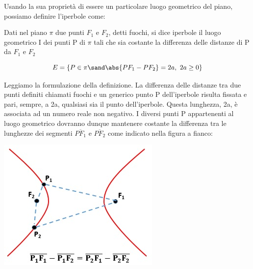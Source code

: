 Usando la sua proprietà di essere un particolare luogo geometrico del 
piano, possiamo definire l'iperbole come:
\begin{definizione}
  Dati nel piano $ \pi $ due punti $ F_{1} $ e $ F_{2} $, detti 
fuochi, si dice iperbole il luogo geometrico I dei punti P di $ \pi $ tali 
che sia costante la differenza delle distanze di P da $F_{1}$ e $F_{2}$ 

\begin{equation}
  E=\{P \in\pi \sand \abs{PF_{1}-PF_{2}} = 2a,~2a \geq 0\}
\end{equation}
\end{definizione}

  \begin{minipage}[c]{.75\textwidth}
Leggiamo la formulazione della definizione. La differenza delle distanze 
tra due punti definiti chiamati fuochi e un generico punto P dell'iperbole 
risulta fissata e pari, sempre, a 2a, qualsiasi sia il punto dell'iperbole. 
Questa lunghezza, 2a, è associata ad un numero reale non negativo.
I diversi punti P appartenenti al luogo geometrico dovranno dunque 
mantenere costante la differenza tra le lunghezze dei segmenti 
$\overline{PF_{1}}$ e $\overline{PF_{2}}$ come indicato nella figura a 
fianco:
  \end{minipage}
  \hspace{.5cm}
  \begin{minipage}[c]{.20\textwidth}
    \includegraphics[width=\textwidth]{img/iperbol1.jpg}
  \end{minipage}

